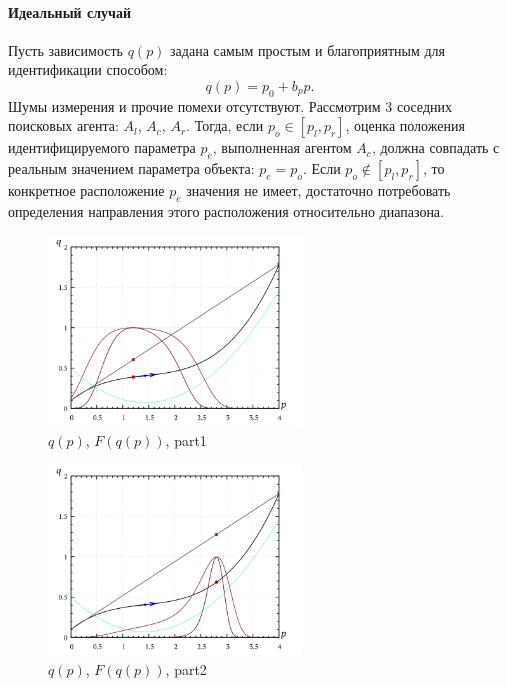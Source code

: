\paragraph{Идеальный случай}

Пусть зависимость $q(p)$ задана самым простым и благоприятным для идентификации способом:
%
\[
  q(p) = p_0 + b_p p .
\]
Шумы измерения и прочие помехи отсутствуют.
Рассмотрим 3 соседних поисковых агента: $A_l$, $A_c$, $A_r$.
Тогда, если $p_o \in [ p_l, p_r ] $, оценка положения
идентифицируемого параметра $p_e$, выполненная агентом $A_c$,
должна совпадать с реальным значением параметра объекта: $p_e = p_o $.
Если $p_o \notin [ p_l, p_r ] $, то конкретное расположение
$p_e$ значения не имеет, достаточно потребовать определения направления
этого расположения относительно диапазона. %


\begin{figure}[htb!]
  \centerline{\includegraphics[width=0.6\textwidth]{pq_1x2.png} }
  \caption{ $q(p)$, $F(q(p))$, part1 }
  \label{atu:pq_1x2}
\end{figure}

\begin{figure}[htb!]
  \centerline{\includegraphics[width=0.6\textwidth]{pq_2x8.png} }
  \caption{$q(p)$, $F(q(p))$, part2 }
  \label{atu:pq_2x8}
\end{figure}


